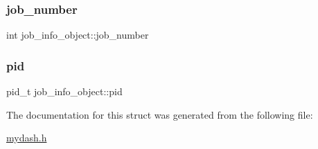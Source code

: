 \subsubsection{\texorpdfstring{job\+\_\+number}{job\_number}}
{\footnotesize\ttfamily int job\+\_\+info\+\_\+object\+::job\+\_\+number}

\mbox{\label{structjob__info__object_aa0d8664138390bff34865cc1b8a69b30}} 
\subsubsection{\texorpdfstring{pid}{pid}}
{\footnotesize\ttfamily pid\+\_\+t job\+\_\+info\+\_\+object\+::pid}



The documentation for this struct was generated from the following file\+:\begin{DoxyCompactItemize}
\item 
\hyperlink{mydash_8h}{mydash.\+h}\end{DoxyCompactItemize}
